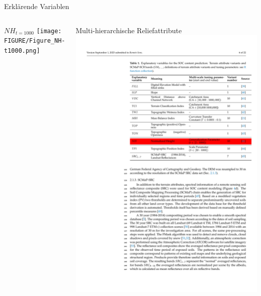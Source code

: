 \begin{frame}{Erklärende Variablen}
\begin{columns}
 \column{4cm}
 \begin{block}{$NH_{t=1000}$}
 \centering\texttt{[image: FIGURE/Figure\_NH-t1000.png]}
\end{block}
 \column{7cm}
 \begin{block}{Multi-hierarchische Reliefattribute}
 \centering\includegraphics[width=1\textwidth]{FIGURE/Table_TerrainAttributes.pdf}
 \end{block}
  \end{columns}
\end{frame}

